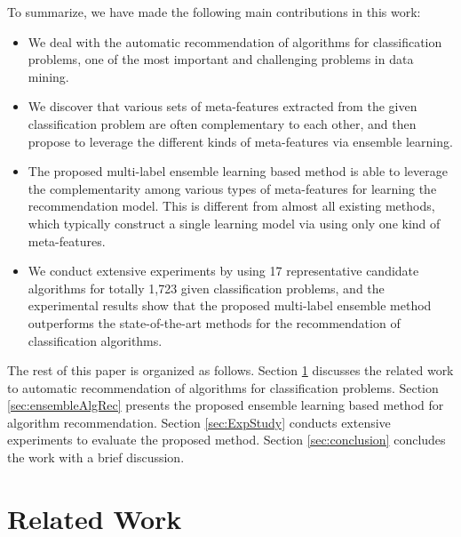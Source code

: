\documentclass[acmsmall]{acmart}
\begin{document}








To summarize, we have made the following main contributions in this work:
\begin{itemize}
	\item We deal with the automatic recommendation of algorithms for classification problems,
	one of the most important and challenging problems in data mining.
	\item We discover that various sets of meta-features extracted from the given classification problem are often complementary to each other,
	and then propose to leverage the different kinds of meta-features via ensemble learning.
	\item The proposed multi-label ensemble learning based method is able to leverage the complementarity among various types of meta-features for learning the recommendation model.
	This is different from almost all existing methods, which typically construct a single learning model via using only one kind of meta-features.	
	\item We conduct extensive experiments by using 17 representative candidate algorithms for totally 1,723 given classification problems,
	and the experimental results show that the proposed multi-label ensemble method outperforms the state-of-the-art methods for the recommendation of classification algorithms.
\end{itemize}


The rest of this paper is organized as follows.
Section \ref{sec:relatedwork} discusses the related work to automatic recommendation of algorithms for classification problems.
Section \ref{sec:ensembleAlgRec} presents the proposed ensemble learning based method for algorithm recommendation.
Section \ref{sec:ExpStudy} conducts extensive experiments to evaluate the proposed method.
Section \ref{sec:conclusion} concludes the work with a brief discussion.

\section{Related Work}\label{sec:relatedwork}
\end{document}
